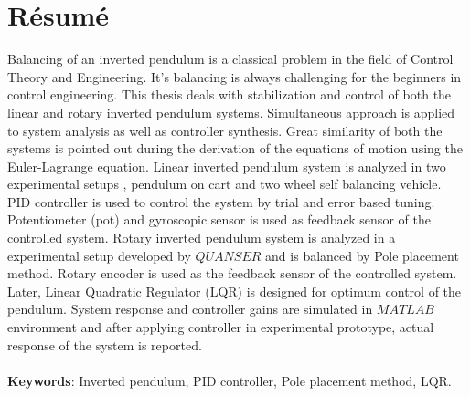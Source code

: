 
\chapter*{Résumé}
Balancing of an inverted pendulum is a classical problem in the field of Control Theory and Engineering. It's balancing is always challenging for the beginners in control engineering. This thesis deals with stabilization and control of both the linear and rotary inverted pendulum  systems. Simultaneous approach is applied to system analysis as well as controller synthesis. Great similarity of both the systems is pointed out during the derivation of the equations of motion using the Euler-Lagrange equation. Linear inverted pendulum system is analyzed in two experimental setups , pendulum on cart and two wheel self balancing vehicle. PID controller is used to control the system by trial and error based tuning. Potentiometer (pot) and gyroscopic sensor is used as feedback sensor of the controlled system. Rotary inverted pendulum system is analyzed in a experimental setup developed by $QUANSER$ and is balanced by Pole placement method. Rotary encoder is used as the feedback sensor of the controlled system. Later, Linear Quadratic Regulator (LQR) is designed for optimum control of the pendulum. System response and controller gains are simulated in $MATLAB$ environment and after applying controller in experimental prototype, actual response of the system is reported. \\ 
\\ \textbf{Keywords}: Inverted pendulum,  PID controller, Pole placement method, LQR.
\clearpage
